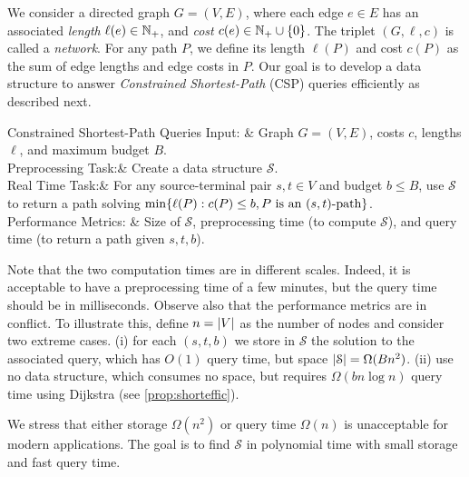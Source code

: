 We consider a directed graph $G=(V,E)$, where each edge $e\in E$ has an associated \emph{length} $\ell(e)\in\mathbb{N}_+$, and \emph{cost} $c(e)\in\mathbb{N}_+\cup\{0\}$.
The triplet $(G,\ell,c)$ is called a \emph{network}.
For any path $P$, we define its length $\ell(P)$ and cost $c(P)$ as the sum of edge lengths and edge costs in $P$. 
Our goal is to develop a data structure to answer \emph{Constrained Shortest-Path} (CSP) queries efficiently as described next.

\begin{problemdef}[framed]{Constrained Shortest-Path Queries}
	Input: & Graph $G=(V,E)$, costs $c$, lengths $\ell$, and maximum budget $B$.\\
	Preprocessing Task:& Create a data structure $\mathcal{S}$. \\
	Real Time Task:& For any source-terminal pair $s,t\in V$ and budget $b\leq B$, use $\mathcal{S}$ to return a path solving $\min\{\ell(P):c(P) \leq b, P \text{ is an } (s,t)\text{-path}\}$.\\
  	Performance Metrics: &  Size of $\mathcal{S}$, preprocessing time (to compute $\mathcal{S}$), and query time (to return a path given $s,t,b$). 
\end{problemdef}


Note that the two computation times are in different scales.
Indeed, it is acceptable to have a preprocessing time of a few minutes, but the query time should be in milliseconds.
Observe also that the performance metrics are in conflict.
To illustrate this, define $n=\lvert V\rvert$ as the number of nodes and consider two extreme cases.
(i) for each $(s,t,b)$ we store in $\mathcal{S}$ the solution to the associated query, which has $O(1)$ query time, but space $\lvert\mathcal{S}\rvert=\Omega(Bn^2)$.
(ii) use no data structure, which consumes no space, but requires $\Omega(bn\log n)$ query time using Dijkstra (see \cref{prop:shorteffic}).

We stress that either storage $\Omega(n^2)$ or query time $\Omega(n)$ is unacceptable for modern applications.
The goal is to find $\mathcal{S}$ in polynomial time with small storage and fast query time.

\medskip
